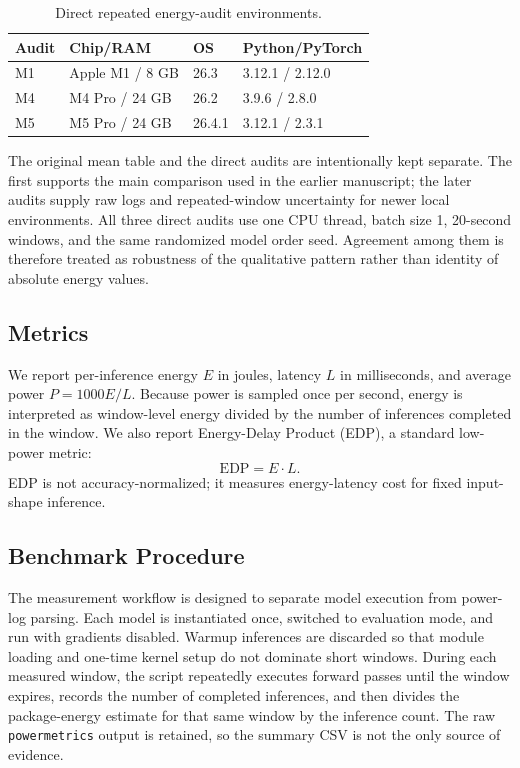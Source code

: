 \documentclass[conference]{IEEEtran}
\begin{document}
\begin{table}[t]
\centering
\caption{Direct repeated energy-audit environments.}
\label{tab:env}
\scriptsize
\setlength{\tabcolsep}{2pt}
\begin{tabular}{llll}
\toprule
Audit & Chip/RAM & OS & Python/PyTorch \\
\midrule
M1 & Apple M1 / 8 GB & 26.3 & 3.12.1 / 2.12.0 \\
M4 & M4 Pro / 24 GB & 26.2 & 3.9.6 / 2.8.0 \\
M5 & M5 Pro / 24 GB & 26.4.1 & 3.12.1 / 2.3.1 \\
\bottomrule
\end{tabular}
\end{table}

The original mean table and the direct audits are intentionally kept separate.
The first supports the main comparison used in the earlier manuscript; the
later audits supply raw logs and repeated-window uncertainty for newer local
environments. All three direct audits use one CPU thread, batch size 1,
20-second windows, and the same randomized model order seed. Agreement among
them is therefore treated as robustness of the qualitative pattern rather than
identity of absolute energy values.

\subsection{Metrics}

We report per-inference energy $E$ in joules, latency $L$ in milliseconds,
and average power $P=1000E/L$. Because power is sampled once per second,
energy is interpreted as window-level energy divided by the number of
inferences completed in the window. We also report Energy-Delay Product
(EDP), a standard low-power metric:
\begin{equation}
\mathrm{EDP}=E\cdot L .
\end{equation}
EDP is not accuracy-normalized; it measures energy-latency cost for fixed
input-shape inference.

\subsection{Benchmark Procedure}

The measurement workflow is designed to separate model execution from power-log
parsing. Each model is instantiated once, switched to evaluation mode, and run
with gradients disabled. Warmup inferences are discarded so that module loading
and one-time kernel setup do not dominate short windows. During each measured
window, the script repeatedly executes forward passes until the window expires,
records the number of completed inferences, and then divides the package-energy
estimate for that same window by the inference count. The raw
\texttt{powermetrics} output is retained, so the summary CSV is not the only
source of evidence.
\end{document}
